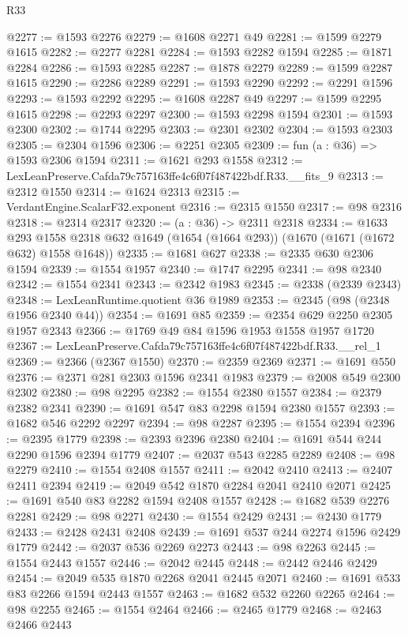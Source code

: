 \begin{lexlean}{R33}
\begin{coremodule}
@2277 := @1593 @2276
@2279 := @1608 @2271 @49
@2281 := @1599 @2279 @1615
@2282 := @2277 @2281
@2284 := @1593 @2282 @1594
@2285 := @1871 @2284
@2286 := @1593 @2285
@2287 := @1878 @2279
@2289 := @1599 @2287 @1615
@2290 := @2286 @2289
@2291 := @1593 @2290
@2292 := @2291 @1596
@2293 := @1593 @2292
@2295 := @1608 @2287 @49
@2297 := @1599 @2295 @1615
@2298 := @2293 @2297
@2300 := @1593 @2298 @1594
@2301 := @1593 @2300
@2302 := @1744 @2295
@2303 := @2301 @2302
@2304 := @1593 @2303
@2305 := @2304 @1596
@2306 := @2251 @2305
@2309 := fun (a : @36) => @1593 @2306 @1594
@2311 := @1621 @293 @1558
@2312 := LexLeanPreserve.Cafda79c757163ffe4c6f07f487422bdf.R33.__fits_9
@2313 := @2312 @1550
@2314 := @1624 @2313
@2315 := VerdantEngine.ScalarF32.exponent
@2316 := @2315 @1550
@2317 := @98 @2316
@2318 := @2314 @2317
@2320 := (a : @36) -> @2311 @2318
@2334 := @1633
    @293
    @1558
    @2318
    @632
    @1649
    (@1654 (@1664 @293))
    (@1670 (@1671 (@1672 @632) @1558 @1648))
@2335 := @1681 @627
@2338 := @2335 @630 @2306 @1594
@2339 := @1554 @1957
@2340 := @1747 @2295
@2341 := @98 @2340
@2342 := @1554 @2341
@2343 := @2342 @1983
@2345 := @2338 (@2339 @2343)
@2348 := LexLeanRuntime.quotient @36 @1989
@2353 := @2345 (@98 (@2348 @1956 @2340 @44))
@2354 := @1691 @85
@2359 := @2354 @629 @2250 @2305 @1957 @2343
@2366 := @1769 @49 @84 @1596 @1953 @1558 @1957 @1720
@2367 := LexLeanPreserve.Cafda79c757163ffe4c6f07f487422bdf.R33.__rel_1
@2369 := @2366 (@2367 @1550)
@2370 := @2359 @2369
@2371 := @1691 @550
@2376 := @2371 @281 @2303 @1596 @2341 @1983
@2379 := @2008 @549 @2300 @2302
@2380 := @98 @2295
@2382 := @1554 @2380 @1557
@2384 := @2379 @2382 @2341
@2390 := @1691 @547 @83 @2298 @1594 @2380 @1557
@2393 := @1682 @546 @2292 @2297
@2394 := @98 @2287
@2395 := @1554 @2394
@2396 := @2395 @1779
@2398 := @2393 @2396 @2380
@2404 := @1691 @544 @244 @2290 @1596 @2394 @1779
@2407 := @2037 @543 @2285 @2289
@2408 := @98 @2279
@2410 := @1554 @2408 @1557
@2411 := @2042 @2410
@2413 := @2407 @2411 @2394
@2419 := @2049 @542 @1870 @2284 @2041 @2410 @2071
@2425 := @1691 @540 @83 @2282 @1594 @2408 @1557
@2428 := @1682 @539 @2276 @2281
@2429 := @98 @2271
@2430 := @1554 @2429
@2431 := @2430 @1779
@2433 := @2428 @2431 @2408
@2439 := @1691 @537 @244 @2274 @1596 @2429 @1779
@2442 := @2037 @536 @2269 @2273
@2443 := @98 @2263
@2445 := @1554 @2443 @1557
@2446 := @2042 @2445
@2448 := @2442 @2446 @2429
@2454 := @2049 @535 @1870 @2268 @2041 @2445 @2071
@2460 := @1691 @533 @83 @2266 @1594 @2443 @1557
@2463 := @1682 @532 @2260 @2265
@2464 := @98 @2255
@2465 := @1554 @2464
@2466 := @2465 @1779
@2468 := @2463 @2466 @2443

\end{coremodule}
\end{lexlean}
